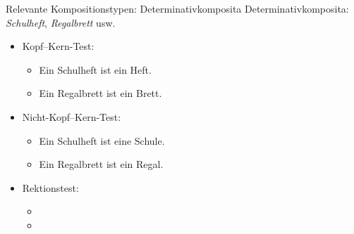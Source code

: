 \begin{frame}
  {Relevante Kompositionstypen: Determinativkomposita}
  \onslide<+->
  Determinativkomposita: \textit{Schulheft}, \textit{Regalbrett} usw.
  \Halbzeile
  \begin{itemize}[<+->]
    \item Kopf--Kern-Test:
      \begin{itemize}[<+->]
        \item Ein Schulheft ist ein Heft. \Ck
        \item Ein Regalbrett ist ein Brett. \Ck
      \end{itemize}
    \item Nicht-Kopf--Kern-Test:
      \begin{itemize}[<+->]
        \item Ein Schulheft ist eine Schule. \Fl
        \item Ein Regalbrett ist ein Regal. \Fl
      \end{itemize}
      \Halbzeile
    \item Rektionstest:
      \begin{itemize}[<+->]
        \item {}
        \item {}
      \end{itemize}
  \end{itemize}
\end{frame}


